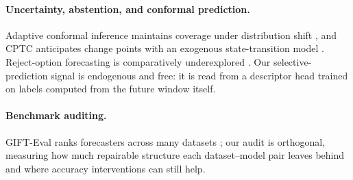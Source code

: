 \paragraph{Uncertainty, abstention, and conformal prediction.}
Adaptive conformal inference maintains coverage under distribution shift \citep{gibbs2021aci,gibbs2024dtaci}, and CPTC anticipates change points with an exogenous state-transition model \citep{cptc}. Reject-option forecasting is comparatively underexplored \citep{boundedabstention,rejectoptiontsf}. Our selective-prediction signal is endogenous and free: it is read from a descriptor head trained on labels computed from the future window itself.
\paragraph{Benchmark auditing.}
GIFT-Eval ranks forecasters across many datasets \citep{gifteval}; our audit is orthogonal, measuring how much repairable structure each dataset--model pair leaves behind and where accuracy interventions can still help.
